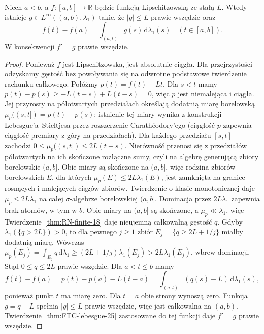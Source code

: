 \begin{lemat}
\label{lem:rademacher-line-28}
Niech $a<b$, a $f:[a,b]\to\mathbb R$ będzie funkcją
Lipschitzowską ze stałą $L$. Wtedy istnieje
$g\in L^\infty((a,b),\lambda_1)$ takie, że
$|g|\le L$ prawie wszędzie oraz
\[
 f(t)-f(a)=\int_{(a,t)}g(s)\,\mathrm d\lambda_1(s)
 \quad (t\in[a,b]).
\]
W konsekwencji $f'=g$ prawie wszędzie.
\end{lemat}
\begin{proof}
Ponieważ $f$ jest Lipschitzowska, jest absolutnie ciągła.
Dla przejrzystości odzyskamy gęstość bez powoływania się na
odwrotne podstawowe twierdzenie rachunku całkowego.
Połóżmy $p(t)=f(t)+Lt$. Dla $s<t$ mamy
$p(t)-p(s)\ge -L(t-s)+L(t-s)=0$, więc $p$ jest
niemalejąca i ciągła. Jej przyrosty na półotwartych
przedziałach określają dodatnią miarę borelowską
$\mu_p((s,t])=p(t)-p(s)$; istnienie tej miary wynika
z konstrukcji Lebesgue'a--Stieltjesa przez rozszerzenie
Carathéodory'ego (ciągłość $p$ zapewnia ciągłość
premiary z góry na przedziałach). Dla każdego przedziału
$[s,t]$ zachodzi
$0\le\mu_p((s,t])\le2L(t-s)$.
Nierówność przenosi się z przedziałów półotwartych na
ich skończone rozłączne sumy, czyli na algebrę generującą
zbiory borelowskie $(a,b]$. Obie miary są skończone na
$(a,b]$, więc rodzina zbiorów borelowskich $E$, dla których
$\mu_p(E)\le2L\lambda_1(E)$, jest zamknięta na granice
rosnących i malejących ciągów zbiorów.
Twierdzenie o klasie monotonicznej daje
$\mu_p\le2L\lambda_1$ na całej $\sigma$-algebrze borelowskiej
$(a,b]$. Dominacja przez $2L\lambda_1$ zapewnia brak atomów,
w tym w $b$. Obie miary na $(a,b]$ są skończone,
a $\mu_p\ll\lambda_1$, więc Twierdzenie~\ref{thm:RN-finite-18}
daje nieujemną całkowalną gęstość $q$.
Gdyby $\lambda_1(\{q>2L\})>0$, to dla pewnego
$j\ge1$ zbiór $E_j=\{q\ge2L+1/j\}$ miałby dodatnią
miarę. Wówczas
$\mu_p(E_j)=\int_{E_j}q\,\mathrm d\lambda_1
\ge(2L+1/j)\lambda_1(E_j)>2L\lambda_1(E_j)$,
wbrew dominacji. Stąd $0\le q\le2L$ prawie wszędzie.
Dla $a<t\le b$ mamy
\[
 f(t)-f(a)=p(t)-p(a)-L(t-a)
 =\int_{(a,t)}(q(s)-L)\,\mathrm d\lambda_1(s),
\]
ponieważ punkt $t$ ma miarę zero. Dla $t=a$
obie strony wynoszą zero. Funkcja $g=q-L$ spełnia
$|g|\le L$ prawie wszędzie, więc jest całkowalna
na $(a,b)$. Twierdzenie~\ref{thm:FTC-lebesgue-25}
zastosowane do tej funkcji daje $f'=g$ prawie wszędzie.
\end{proof}

